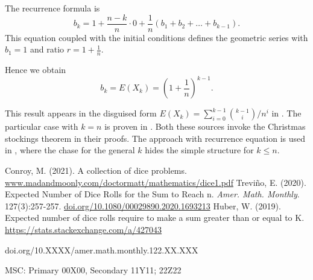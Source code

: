 \documentclass{article}
\theoremstyle{plain}
\begin{document}
\begin{filler}
The recurrence formula is
\[
b_k = 1 + \frac{n - k}{n} \cdot 0 + \frac{1}{n} (b_1 + b_2 + \ldots + b_{k-1}).
\]
This equation coupled with the initial conditions defines the geometric series with $b_1 = 1$ and ratio $r = 1 + \frac{1}{n}$.

Hence we obtain
\[
b_k = E(X_k) = \left( 1 + \frac{1}{n} \right)^{k-1}.
\]


This result appears in the disguised form $E(X_k) = \sum_{i=0}^{k-1} \binom{k-1}{i} / n^i$ in \cite{conroy2021collection}.
The particular case with $k=n$ is proven in \cite{trevino2020expected}.
Both these sources invoke the Christmas stockings theorem in their proofs.
The approach with recurrence equation is used in \cite{427043}, 
where the chase for the general $k$ hides the simple structure for $k\leq n$. 


\begin{thebibliography}{1}
 Conroy, M. (2021). A collection of dice problems. \url{www.madandmoonly.com/doctormatt/mathematics/dice1.pdf}
 Trevi{\~n}o, E. (2020). Expected Number of Dice Rolls for the Sum to Reach n. \textit{Amer. Math. Monthly}. 127(3):257-257.
\url{doi.org/10.1080/00029890.2020.1693213}
 Huber, W. (2019). Expected number of dice rolls require to make a sum greater than or equal to K. \url{https://stats.stackexchange.com/a/427043}
\end{thebibliography}




\bigskip
\footnoterule
\footnotesize{doi.org/10.XXXX/amer.math.monthly.122.XX.XXX}

\footnotesize{MSC: Primary 00X00, Secondary 11Y11; 22Z22}

\end{filler}
\end{document}
